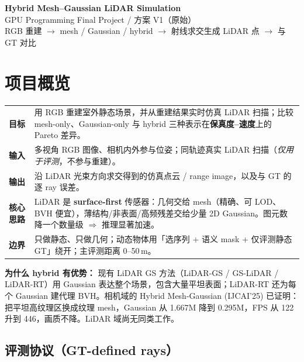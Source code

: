 \documentclass[10pt,a4paper]{article}
\begin{document}
\begin{center}
{\LARGE\bfseries\color{cblue} Hybrid Mesh--Gaussian LiDAR Simulation}\\[3pt]
{\large GPU Programming Final Project \;/\; 方案 V1（原始）}\\[2pt]
{\small\color{cgray} RGB 重建 $\rightarrow$ mesh / Gaussian / hybrid $\rightarrow$ 射线求交生成 LiDAR 点 $\rightarrow$ 与 GT 对比}
\end{center}

\vspace{-4pt}

\section{项目概览}

\begin{tabularx}{\textwidth}{@{}p{2.4cm}Y@{}}
\toprule
\textbf{目标} & 用 RGB 重建室外静态场景，并从重建结果实时仿真 LiDAR 扫描；比较 mesh-only、Gaussian-only 与 hybrid 三种表示在\textbf{保真度--速度}上的 Pareto 差异。\\
\textbf{输入} & 多视角 RGB 图像、相机内外参与位姿；同轨迹真实 LiDAR 扫描（\emph{仅用于评测}，不参与重建）。\\
\textbf{输出} & 沿 LiDAR 光束方向求交得到的仿真点云 / range image，以及与 GT 的逐 ray 误差。\\
\textbf{核心思路} & LiDAR 是 \textbf{surface-first} 传感器：几何交给 mesh（精确、可 LOD、BVH 便宜），薄结构/非表面/高频残差交给少量 2D Gaussian。图元数降一个数量级 $\Rightarrow$ 推理显著加速。\\
\textbf{边界} & 只做静态、只做几何；动态物体用「选序列 + 语义 mask + 仅评测静态 GT」绕开；主评测距离 0--50\,m。\\
\bottomrule
\end{tabularx}

\begin{tcolorbox}[colback=blue!4,colframe=cblue!60,boxrule=0.6pt,arc=2pt,left=4pt,right=4pt,top=2pt,bottom=2pt]
\textbf{为什么 hybrid 有优势：} 现有 LiDAR GS 方法（LiDAR-GS / GS-LiDAR / LiDAR-RT）用 Gaussian 表达整个场景，包含大量平坦表面；LiDAR-RT 还为每个 Gaussian 建代理 BVH。相机域的 Hybrid Mesh-Gaussian (IJCAI'25) 已证明：把平坦高纹理区换成纹理 mesh，Gaussian 从 1.667M 降到 0.295M，FPS 从 122 升到 446，画质不降。LiDAR 域尚无同类工作。
\end{tcolorbox}

\subsection{评测协议（GT-defined rays）}
\end{document}
